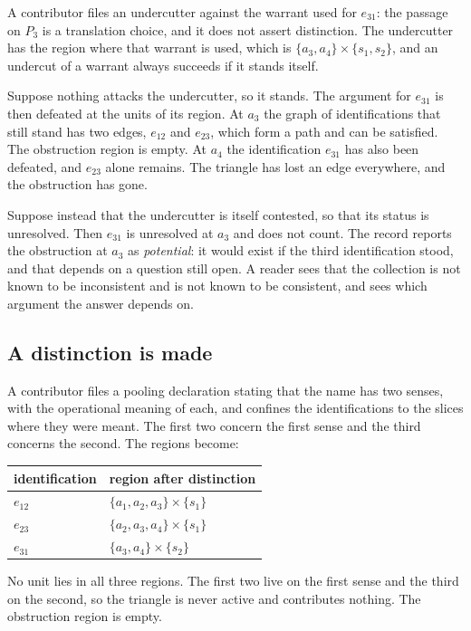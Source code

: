 \documentclass[11pt]{article}
\begin{document}
A contributor files an undercutter against the warrant used for $e_{31}$: the passage on $P_3$ is a translation choice, and it does not assert distinction. The undercutter has the region where that warrant is used, which is $\{a_3,a_4\}\times\{s_1,s_2\}$, and an undercut of a warrant always succeeds if it stands itself.

Suppose nothing attacks the undercutter, so it stands. The argument for $e_{31}$ is then defeated at the units of its region. At $a_3$ the graph of identifications that still stand has two edges, $e_{12}$ and $e_{23}$, which form a path and can be satisfied. The obstruction region is empty. At $a_4$ the identification $e_{31}$ has also been defeated, and $e_{23}$ alone remains. The triangle has lost an edge everywhere, and the obstruction has gone.

Suppose instead that the undercutter is itself contested, so that its status is unresolved. Then $e_{31}$ is unresolved at $a_3$ and does not count. The record reports the obstruction at $a_3$ as \emph{potential}: it would exist if the third identification stood, and that depends on a question still open. A reader sees that the collection is not known to be inconsistent and is not known to be consistent, and sees which argument the answer depends on.

\subsection{A distinction is made}

A contributor files a pooling declaration stating that the name has two senses, with the operational meaning of each, and confines the identifications to the slices where they were meant. The first two concern the first sense and the third concerns the second. The regions become:
\begin{center}
\small
\begin{tabular}{@{}l l@{}}
\toprule
identification & region after distinction\\
\midrule
$e_{12}$ & $\{a_1,a_2,a_3\}\times\{s_1\}$\\
$e_{23}$ & $\{a_2,a_3,a_4\}\times\{s_1\}$\\
$e_{31}$ & $\{a_3,a_4\}\times\{s_2\}$\\
\bottomrule
\end{tabular}
\end{center}
No unit lies in all three regions. The first two live on the first sense and the third on the second, so the triangle is never active and contributes nothing. The obstruction region is empty.
\end{document}
